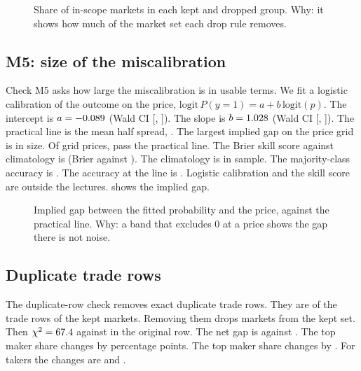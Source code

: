 \begin{figure}[H]
\centering
{}
\caption{Share of in-scope markets in each kept and dropped group. Why: it shows how much of the market set each drop rule removes.}%
\label{fig:r3-m4}
\end{figure}

\subsection{M5: size of the miscalibration}\label{sec:app-m5}
Check M5 asks how large the miscalibration is in usable terms.
We fit a logistic calibration of the outcome on the price, $\mathrm{logit}\,P(y=1)=a+b\,\mathrm{logit}(p)$.
The intercept is $a=-0.089$ (Wald \CiLevel{} CI [\RThreeMFiveAWaldLow, \RThreeMFiveAWaldHigh]).
The slope is $b=1.028$ (Wald \CiLevel{} CI [\RThreeMFiveBWaldLow, \RThreeMFiveBWaldHigh]).
The practical line is the mean half spread, \RThreeMOneMeanHalfSpread.
The largest implied gap on the price grid is \RThreeMFiveMaxAbsDelta{} in size.
Of \RThreeMFiveGridPrices{} grid prices, \RThreeMFivePracticalPrices{} pass the practical line.
The Brier skill score against climatology is \RThreeMFiveSkill{} (Brier \RThreeMFiveBrier{} against \RThreeMFiveClimatologyBrier).
The climatology is in sample.
The majority-class accuracy is \RThreeMFiveMajorityAccuracy.
The accuracy at the \FavoriteLine{} line is \RThreeMFiveAccuracyHalf.
Logistic calibration and the skill score are outside the lectures.
 shows the implied gap.

\begin{figure}[H]
\centering
{}
\caption{Implied gap between the fitted probability and the price, against the practical line. Why: a band that excludes 0 at a price shows the gap there is not noise.}%
\label{fig:r3-m5}
\end{figure}

\subsection{Duplicate trade rows}\label{sec:app-dup}
The duplicate-row check removes exact duplicate trade rows.
They are \RThreeMinorFourDupShare{} of the trade rows of the kept markets.
Removing them drops \RThreeMinorFourRemoved{} markets from the kept set.
Then $\chi^2=67.4$ against \QOneChiSq{} in the original row.
The net gap is \RThreeMinorFourNetGap{} against \GapNetDiffMain.
The top \TopOneLabel{} maker share changes by \RThreeMinorFourMakerTopOneDeltaPp{} percentage points.
The top \TopTwentyLabel{} maker share changes by \RThreeMinorFourMakerTopTwentyDeltaPp.
For takers the changes are \RThreeMinorFourTakerTopOneDeltaPp{} and \RThreeMinorFourTakerTopTwentyDeltaPp.

